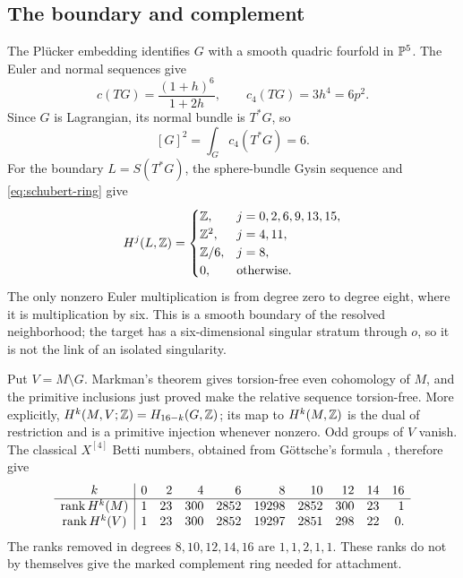 \subsection{The boundary and complement}
The Plücker embedding identifies \(G\) with a smooth quadric
fourfold in \(\mathbb P^5\). The Euler and normal sequences give
\[
 c(TG)=\frac{(1+h)^6}{1+2h},\qquad
 c_4(TG)=3h^4=6p^2 .
\]
Since \(G\) is Lagrangian, its normal bundle is \(T^*G\), so
\begin{equation}\label{eq:self-intersection}
 [G]^2=\int_G c_4(T^*G)=6 .
\end{equation}
For the boundary \(L=S(T^*G)\), the sphere-bundle Gysin sequence
and \eqref{eq:schubert-ring} give
\begin{equation}\label{eq:boundary-groups}
 H^j(L,\mathbb Z)=
 \begin{cases}
 \mathbb Z,&j=0,2,6,9,13,15,\\
 \mathbb Z^2,&j=4,11,\\
 \mathbb Z/6,&j=8,\\
 0,&\text{otherwise}.
 \end{cases}
\end{equation}
The only nonzero Euler multiplication is from degree zero
to degree eight, where it is multiplication by six.
This is a smooth boundary of the resolved neighborhood;
the target has a six-dimensional singular stratum through \(o\),
so it is not the link of an isolated singularity.

Put \(V=M\setminus G\). Markman's theorem gives torsion-free even
cohomology of \(M\), and the primitive inclusions just proved
make the relative sequence torsion-free. More explicitly,
\(H^k(M,V;\mathbb Z)=H_{16-k}(G,\mathbb Z)\); its map to \(H^k(M,\mathbb Z)\)
is the dual of restriction and is a primitive injection whenever
nonzero. Odd groups of \(V\) vanish. The classical \(X^{[4]}\)
Betti numbers, obtained from Göttsche's formula \cite{gottsche},
therefore give
\[
\begin{array}{c|rrrrrrrrr}
k&0&2&4&6&8&10&12&14&16\\ \hline
\operatorname{rank} H^k(M)&1&23&300&2852&19298&2852&300&23&1\\
\operatorname{rank} H^k(V)&1&23&300&2852&19297&2851&298&22&0 .
\end{array}
\]
The ranks removed in degrees \(8,10,12,14,16\) are
\(1,1,2,1,1\). These ranks do not by themselves give the
marked complement ring needed for attachment.

